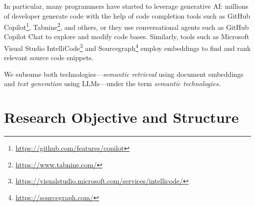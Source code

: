 In particular, many programmers have started to leverage generative AI: millions of developer generate code with the help of code completion tools such as GitHub Copilot\footnote{\url{https://github.com/features/copilot}}, Tabnine\footnote{\url{https://www.tabnine.com/}}, and others, or they use conversational agents such as GitHub Copilot Chat %
to explore and modify code bases.
Similarly, tools such as Microsoft Visual Studio IntelliCode\footnote{\url{https://visualstudio.microsoft.com/services/intellicode/}} and Sourcegraph\footnote{\url{https://sourcegraph.com/}} employ embeddings to find and rank relevant source code snippets.

We subsume both technologies---\emph{semantic retrieval} using document embeddings and \emph{text generation} using LLMs---under the term \emph{semantic technologies}.

\section*{Research Objective and Structure}

